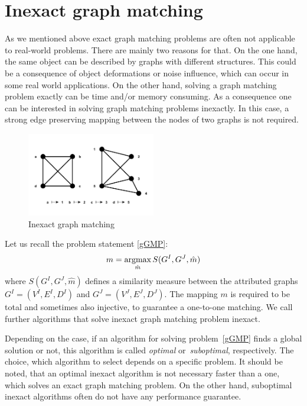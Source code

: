 \section{Inexact graph matching}
As we mentioned above exact graph matching problems are often not applicable to real-world problems. There are mainly two reasons for that. %
On the one hand, the same object can be described by graphs with different structures. %
This could be a consequence of object deformations or noise influence, which can occur in some real world applications. On the other hand, solving a graph matching problem exactly can be time and/or memory consuming. As a consequence one can be interested in solving graph matching problems inexactly. In this case, a strong edge preserving mapping between the nodes of two graphs is not required.

\vspace{-12pt}
\begin{figure}[htb]
	\centering
	\includegraphics[width=0.5\textwidth]{chapter1/fig/inexactGM}
    \caption{Inexact graph matching}
    \label{fig:inexact_GM}
\end{figure}
\vspace{-10pt}
Let us recall the problem statement \eqref{gGMP}: 
\begin{equation*}
m = \mathop{\rm argmax}_{\hat{m}}S(G^I, G^J, \hat{m})
\end{equation*}
where $S(G^I, G^J, \hat{m})$ defines a similarity measure between the attributed graphs $G^I = (V^I, E^I,D^I)$ and $G^J = (V^J, E^J,D^J)$. The mapping $m$ is required to be total and sometimes also injective, to guarantee a one-to-one matching. We call further algorithms that solve inexact graph matching problem inexact.

Depending on the case, if an algorithm for solving problem~\eqref{gGMP} finds a global solution or not, this algorithm is called \emph{optimal} or~\emph{suboptimal}, respectively. The choice, which algorithm to select depends on a specific problem. It should be noted, that an optimal inexact algorithm is not necessary faster than a one, which solves an exact graph matching problem. On the other hand, suboptimal inexact algorithms often do not have any performance guarantee.

